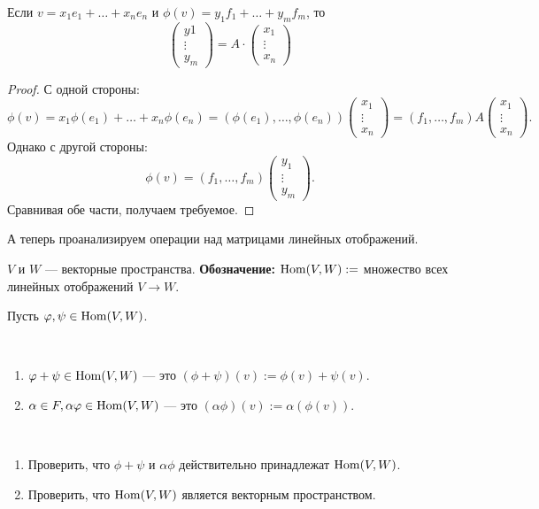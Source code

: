 \begin{Suggestion}
Если $v = x_1 e_1 + \ldots + x_ne_n$ и $\phi(v) = y_1f_1 + \ldots + y_mf_m$, то 
\[
\begin{pmatrix*}
y1 \\
\vdots \\
y_m
\end{pmatrix*}
= A \cdot
\begin{pmatrix*}
x_1 \\
\vdots \\
x_n
\end{pmatrix*}
\]
\end{Suggestion}

\begin{proof}
С одной стороны:
\[
\phi(v) = x_1 \phi(e_1) + \ldots + x_n\phi(e_n) = (\phi(e_1), \ldots, \phi(e_n))\begin{pmatrix*}x_1 \\ \vdots \\ x_n\end{pmatrix*} = (f_1, \ldots, f_m)A\begin{pmatrix*}x_1 \\ \vdots \\ x_n\end{pmatrix*}.
\]
Однако с другой стороны:
\[
\phi(v) = (f_1, \ldots, f_m)\begin{pmatrix*}y_1 \\ \vdots \\ y_m\end{pmatrix*}.
\]
Сравнивая обе части, получаем требуемое.
\end{proof}

А теперь проанализируем операции над матрицами линейных отображений.

$V$ и $W$ --- векторные пространства. \textbf{Обозначение:} $\mathrm{Hom}(V, W):=$ множество всех линейных отображений $V \rightarrow W$.

Пусть $\varphi, \psi \in \mathrm{Hom}(V, W)$.

\begin{Def}\ 
\begin{enumerate}
\item $\varphi + \psi \in \mathrm{Hom}(V, W)$ --- это $(\phi + \psi)(v):= \phi(v) + \psi(v)$.
\item $\alpha \in F, \alpha\varphi \in \mathrm{Hom}(V, W)$ --- это $(\alpha\phi)(v) := \alpha(\phi(v))$.
\end{enumerate}
\end{Def}

\begin{Task}\
\begin{enumerate}
\item Проверить, что $\phi + \psi$ и $\alpha\phi$ действительно принадлежат $\mathrm{Hom}(V, W)$.
\item Проверить, что $\mathrm{Hom}(V, W)$ является векторным пространством.
\end{enumerate}
\end{Task}

